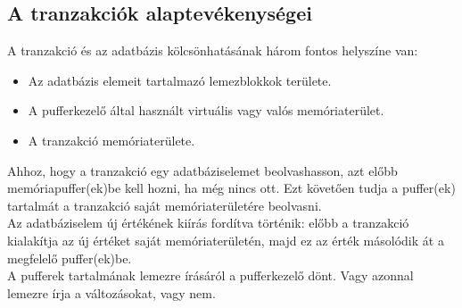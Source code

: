 \documentclass[12pt,margin=0px]{article}
\begin{document}
	\subsection*{A tranzakciók alaptevékenységei}
	
	\noindent A tranzakció és az adatbázis kölcsönhatásának három fontos helyszíne van:
	\begin{itemize}
		\item	Az adatbázis elemeit tartalmazó lemezblokkok területe.
		\item	A pufferkezelő által használt virtuális vagy valós memóriaterület.
		\item	A tranzakció memóriaterülete.
	\end{itemize}
	
    \noindent Ahhoz, hogy a tranzakció egy adatbáziselemet beolvashasson, azt előbb memóriapuffer(ek)be kell hozni, ha még nincs ott. Ezt követően tudja a puffer(ek) tartalmát a tranzakció saját memóriaterületére beolvasni.\\

    \noindent Az adatbáziselem új értékének kiírás fordítva történik: előbb a tranzakció kialakítja az új értéket saját memóriaterületén, majd ez az érték másolódik át a megfelelő puffer(ek)be.\\

    \noindent A pufferek tartalmának lemezre írásáról a pufferkezelő dönt. Vagy azonnal lemezre írja a változásokat, vagy nem.\\
	
\end{document}
